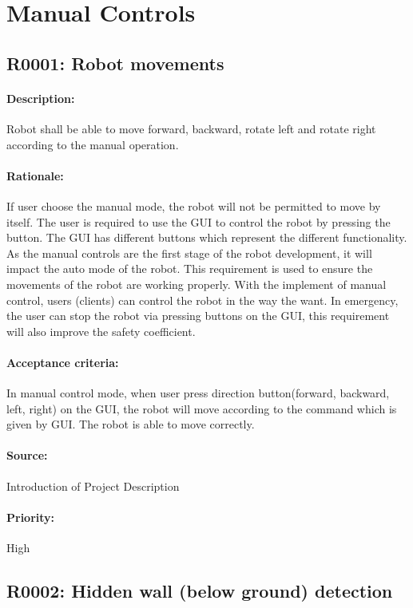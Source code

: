 \documentclass[11pt, a4paper]{report}
\begin{document}
\section{Manual Controls}
\subsection{R0001: Robot movements}
\paragraph{Description: }
Robot shall be able to move forward, backward, rotate left and rotate right according to the manual operation.
\paragraph{Rationale: }
 If user choose the manual mode, the robot will not be permitted  to move by itself. The user is required to use the GUI to control the robot by pressing the button. The GUI has different buttons which represent the different functionality. As the manual controls are the first stage of the robot development, it will impact the auto mode of the robot. This requirement is used to ensure the movements of the robot are working properly. With the implement of manual control, users (clients) can control the robot in the way the want. In emergency, the user can stop the robot via pressing buttons on the GUI, this requirement will also improve the safety coefficient. 
\paragraph{Acceptance criteria: }
In manual control mode, when user press direction button(forward, backward, left, right) on the GUI, the robot will move according to the command which is given by GUI. The robot is able to move correctly.   
\paragraph{Source: }
 Introduction of Project Description
\paragraph{Priority: }
High



\subsection{R0002: Hidden wall (below ground) detection}
\end{document}

